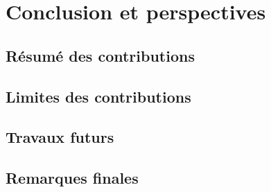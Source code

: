 \chapter{Conclusion et perspectives}

\section{Résumé des contributions}

\section{Limites des contributions}

\section{Travaux futurs}

\section{Remarques finales}
